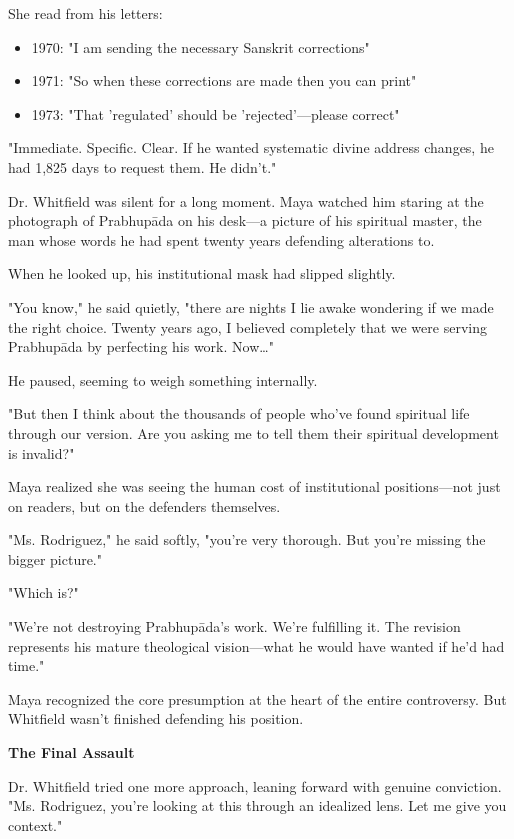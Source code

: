 \documentclass[12pt,twoside]{book}
\begin{document}
She read from his letters:
\begin{itemize}
\item 1970: "I am sending the necessary Sanskrit corrections"
\item 1971: "So when these corrections are made then you can print"
\item 1973: "That 'regulated' should be 'rejected'—please correct"
\end{itemize}

"Immediate. Specific. Clear. If he wanted systematic divine address changes, he had 1,825 days to request them. He didn't."

Dr. Whitfield was silent for a long moment. Maya watched him staring at the photograph of Prabhupāda on his desk—a picture of his spiritual master, the man whose words he had spent twenty years defending alterations to.

When he looked up, his institutional mask had slipped slightly.

"You know," he said quietly, "there are nights I lie awake wondering if we made the right choice. Twenty years ago, I believed completely that we were serving Prabhupāda by perfecting his work. Now\ldots{}"

He paused, seeming to weigh something internally.

"But then I think about the thousands of people who've found spiritual life through our version. Are you asking me to tell them their spiritual development is invalid?"

Maya realized she was seeing the human cost of institutional positions—not just on readers, but on the defenders themselves.

"Ms. Rodriguez," he said softly, "you're very thorough. But you're missing the bigger picture."

"Which is?"

"We're not destroying Prabhupāda's work. We're fulfilling it. The revision represents his mature theological vision—what he would have wanted if he'd had time."

Maya recognized the core presumption at the heart of the entire controversy. But Whitfield wasn't finished defending his position.


\vspace{0.5cm}
\textbf{The Final Assault}
\vspace{0.2cm}


Dr. Whitfield tried one more approach, leaning forward with genuine conviction. "Ms. Rodriguez, you're looking at this through an idealized lens. Let me give you context."
\end{document}
